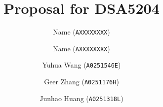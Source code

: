 \author{
  Name (\texttt{AXXXXXXXX})
  \and
  Name (\texttt{AXXXXXXXX})
  \and
  Yuhua Wang (\texttt{A0251546E})
  \and
  Geer Zhang (\texttt{A0251176H})
  \and
  Junhao Huang (\texttt{A0251318L})
}

\title{Proposal for DSA5204}  %
\date{}

